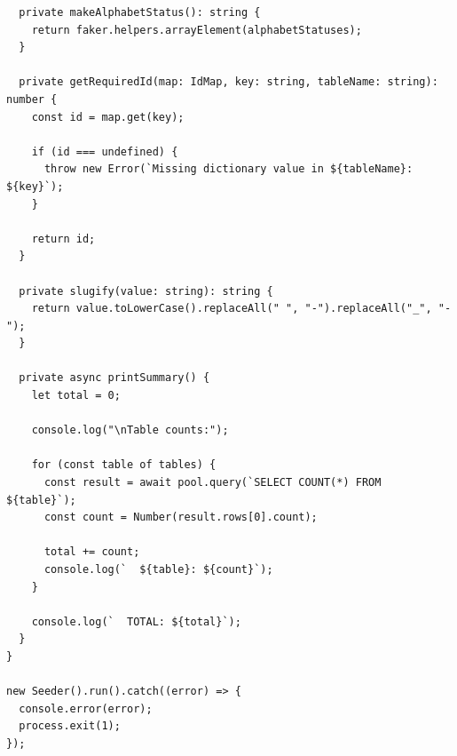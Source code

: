 \begin{verbatim}
  private makeAlphabetStatus(): string {
    return faker.helpers.arrayElement(alphabetStatuses);
  }

  private getRequiredId(map: IdMap, key: string, tableName: string): number {
    const id = map.get(key);

    if (id === undefined) {
      throw new Error(`Missing dictionary value in ${tableName}: ${key}`);
    }

    return id;
  }

  private slugify(value: string): string {
    return value.toLowerCase().replaceAll(" ", "-").replaceAll("_", "-");
  }

  private async printSummary() {
    let total = 0;

    console.log("\nTable counts:");

    for (const table of tables) {
      const result = await pool.query(`SELECT COUNT(*) FROM ${table}`);
      const count = Number(result.rows[0].count);

      total += count;
      console.log(`  ${table}: ${count}`);
    }

    console.log(`  TOTAL: ${total}`);
  }
}

new Seeder().run().catch((error) => {
  console.error(error);
  process.exit(1);
});


\end{verbatim}
